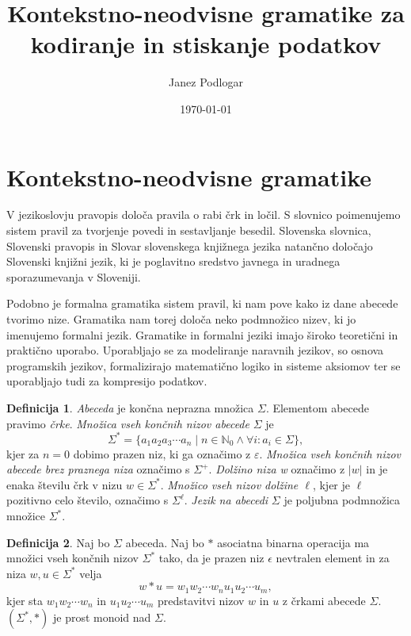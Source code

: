 \documentclass{amsart}
\title{Kontekstno-neodvisne gramatike za kodiranje in stiskanje podatkov}
\author{Janez Podlogar}
\date{\today}
\newcommand{\N}{\mathbb{N}}
\theoremstyle{definition}
\newtheorem{definicija}{Definicija}[section]
\theoremstyle{plain} %
\begin{document}




\maketitle

\section{Kontekstno-neodvisne gramatike}

V jezikoslovju pravopis določa pravila o rabi črk in ločil. S slovnico poimenujemo sistem pravil za tvorjenje
povedi in sestavljanje besedil. Slovenska slovnica, Slovenski pravopis in Slovar slovenskega knjižnega jezika
natančno določajo Slovenski knjižni jezik, ki je poglavitno sredstvo javnega in uradnega sporazumevanja v Sloveniji.


Podobno je formalna gramatika sistem pravil, ki nam pove kako iz dane abecede tvorimo nize. Gramatika nam torej določa
neko podmnožico nizev, ki jo imenujemo formalni jezik. Gramatike in formalni jeziki imajo široko teoretični in praktično
uporabo. Uporabljajo se za modeliranje naravnih jezikov, so osnova programskih jezikov, formalizirajo matematično logiko in
sisteme aksiomov ter se uporabljajo tudi za kompresijo podatkov.

\begin{definicija}

    \textit{Abeceda} je končna neprazna množica $ \Sigma $. Elementom abecede pravimo \textit{črke}.
    \textit{Množica vseh končnih nizov abecede} $ \Sigma $ je
    \[
        \Sigma^* = \{ a_1 a_2 a_3 \cdots a_n \mid n \in \N_0 \land \forall i: a_i \in \Sigma \}, 
    \]
    kjer za $ n = 0 $ dobimo prazen niz, ki ga označimo z $ \varepsilon $.
    \textit{Množica vseh končnih nizov abecede brez praznega niza} označimo s $ \Sigma^+ $.
    \textit{Dolžino niza w} označimo z $ |w| $ in je enaka številu črk v nizu $ w \in \Sigma^* $.
    \textit{Množico vseh nizov dolžine $ \ell $}, kjer je $ \ell $ pozitivno celo število, označimo s $ \Sigma^\ell $.
    \textit{Jezik na abecedi} $ \Sigma $ je poljubna podmnožica množice $ \Sigma^* $.
    

\end{definicija}

\begin{definicija}
    
    Naj bo $ \Sigma $ abeceda. Naj bo $ * $ asociatna binarna operacija ma množici vseh končnih nizov $ \Sigma^* $
    tako, da je prazen niz $ \epsilon $ nevtralen element in za niza $ w, u \in \Sigma^* $ velja
    \[
        w*u = w_1w_2 \cdots w_nu_1u_2 \cdots u_m,
    \]
    kjer sta $ w_1w_2 \cdots w_n $ in $ u_1u_2 \cdots u_m $ predstavitvi nizov $ w $ in $ u $ z črkami abecede $ \Sigma $.
    $ (\Sigma^*, *) $ je prost monoid nad $ \Sigma $.

\end{definicija}
\end{document}
